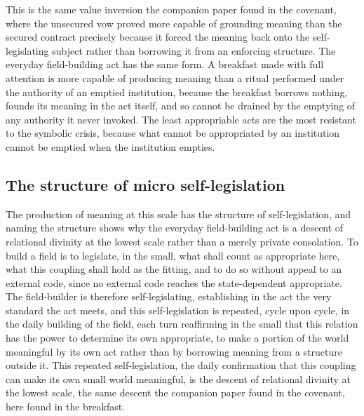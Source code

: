 
This is the same value inversion the companion paper found in the covenant, where the unsecured vow proved more capable of grounding meaning than the secured contract precisely because it forced the meaning back onto the self-legislating subject rather than borrowing it from an enforcing structure. The everyday field-building act has the same form. A breakfast made with full attention is more capable of producing meaning than a ritual performed under the authority of an emptied institution, because the breakfast borrows nothing, founds its meaning in the act itself, and so cannot be drained by the emptying of any authority it never invoked. The least appropriable acts are the most resistant to the symbolic crisis, because what cannot be appropriated by an institution cannot be emptied when the institution empties.

\subsection{The structure of micro self-legislation}
\label{p22:sub:self-leg-structure}

The production of meaning at this scale has the structure of self-legislation, and naming the structure shows why the everyday field-building act is a descent of relational divinity at the lowest scale rather than a merely private consolation. To build a field is to legislate, in the small, what shall count as appropriate here, what this coupling shall hold as the fitting, and to do so without appeal to an external code, since no external code reaches the state-dependent appropriate. The field-builder is therefore self-legislating, establishing in the act the very standard the act meets, and this self-legislation is repeated, cycle upon cycle, in the daily building of the field, each turn reaffirming in the small that this relation has the power to determine its own appropriate, to make a portion of the world meaningful by its own act rather than by borrowing meaning from a structure outside it. This repeated self-legislation, the daily confirmation that this coupling can make its own small world meaningful, is the descent of relational divinity at the lowest scale, the same descent the companion paper found in the covenant, here found in the breakfast.

